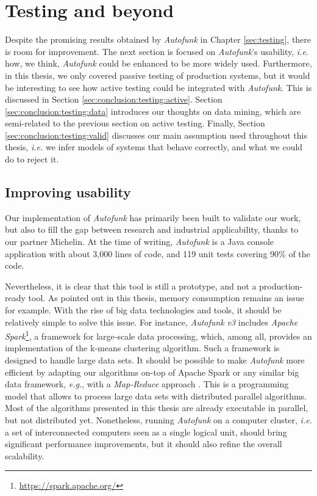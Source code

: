 \section{Testing and beyond}
\label{sec:conclusion:testing}

Despite the promising results obtained by \textit{Autofunk} in
Chapter \ref{sec:testing}, there is room for improvement. The
next section is focused on \textit{Autofunk}'s usability, \emph{i.e.}
how, we think, \textit{Autofunk} could be enhanced to be more
widely used. Furthermore, in this thesis, we only covered passive
testing of production systems, but it would be interesting to see
how active testing could be integrated with \textit{Autofunk}.
This is discussed in Section \ref{sec:conclusion:testing:active}.
Section \ref{sec:conclusion:testing:data} introduces our thoughts
on data mining, which are semi-related to the previous section on
active testing. Finally, Section
\ref{sec:conclusion:testing:valid} discusses our main assumption
used throughout this thesis, \emph{i.e.} we infer models of
systems that behave correctly, and what we could do to reject it.


\subsection{Improving usability}

Our implementation of \textit{Autofunk} has primarily been built
to validate our work, but also to fill the gap between research
and industrial applicability, thanks to our partner Michelin. At
the time of writing, \emph{Autofunk} is a Java console
application with about 3,000 lines of code, and 119 unit tests
covering 90\% of the code.

Nevertheless, it is clear that this tool is still a prototype,
and not a production-ready tool. As pointed out in this thesis,
memory consumption remains an issue for example. With the rise of
big data technologies and tools, it should be relatively simple
to solve this issue. For instance, \emph{Autofunk v3} includes
\emph{Apache Spark}\footnote{\url{https://spark.apache.org/}}, a
framework for large-scale data processing, which, among all,
provides an implementation of the k-means clustering algorithm.
Such a framework is designed to handle large data sets. It should
be possible to make \emph{Autofunk} more efficient by adapting
our algorithms on-top of Apache Spark or any similar big data
framework, \emph{e.g.}, with a \emph{Map-Reduce} approach
\cite{dean2008mapreduce}. This is a programming model that allows
to process large data sets with distributed parallel algorithms.
Most of the algorithms presented in this thesis are already
executable in parallel, but not distributed yet. Nonetheless,
running \emph{Autofunk} on a computer cluster, \emph{i.e.} a set
of interconnected computers seen as a single logical unit, should
bring significant performance improvements, but it should also
refine the overall scalability.

